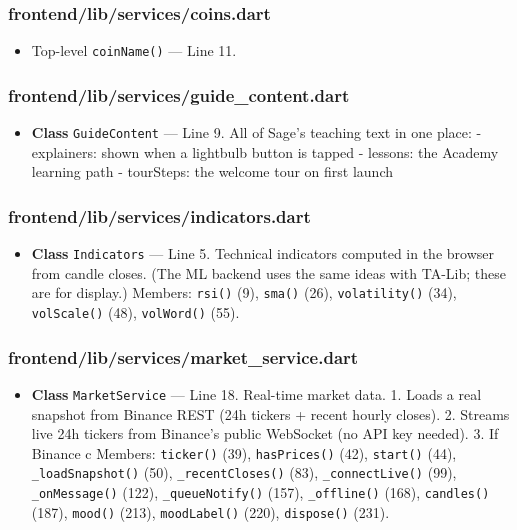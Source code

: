 \subsubsection*{frontend/lib/services/coins.dart}
\begin{itemize}[nosep,leftmargin=1.5em]
\item Top-level \texttt{coinName(\allowbreak{})} --- Line 11.
\end{itemize}
\subsubsection*{frontend/lib/services/guide\_content.dart}
\begin{itemize}[nosep,leftmargin=1.5em]
\item \textbf{Class} \texttt{GuideContent} --- Line 9. All of Sage's teaching text in one place: - explainers: shown when a lightbulb button is tapped - lessons: the Academy learning path - tourSteps: the welcome tour on first launch
\end{itemize}
\subsubsection*{frontend/lib/services/indicators.dart}
\begin{itemize}[nosep,leftmargin=1.5em]
\item \textbf{Class} \texttt{Indicators} --- Line 5. Technical indicators computed in the browser from candle closes. (The ML backend uses the same ideas with TA-Lib; these are for display.) Members: \texttt{rsi(\allowbreak{})} (9), \texttt{sma(\allowbreak{})} (26), \texttt{volatility(\allowbreak{})} (34), \texttt{volScale(\allowbreak{})} (48), \texttt{volWord(\allowbreak{})} (55).
\end{itemize}
\subsubsection*{frontend/lib/services/market\_service.dart}
\begin{itemize}[nosep,leftmargin=1.5em]
\item \textbf{Class} \texttt{MarketService} --- Line 18. Real-time market data. 1. Loads a real snapshot from Binance REST (24h tickers + recent hourly closes). 2. Streams live 24h tickers from Binance's public WebSocket (no API key needed). 3. If Binance c Members: \texttt{ticker(\allowbreak{})} (39), \texttt{hasPrices(\allowbreak{})} (42), \texttt{start(\allowbreak{})} (44), \texttt{\_\allowbreak{}loadSnapshot(\allowbreak{})} (50), \texttt{\_\allowbreak{}recentCloses(\allowbreak{})} (83), \texttt{\_\allowbreak{}connectLive(\allowbreak{})} (99), \texttt{\_\allowbreak{}onMessage(\allowbreak{})} (122), \texttt{\_\allowbreak{}queueNotify(\allowbreak{})} (157), \texttt{\_\allowbreak{}offline(\allowbreak{})} (168), \texttt{candles(\allowbreak{})} (187), \texttt{mood(\allowbreak{})} (213), \texttt{moodLabel(\allowbreak{})} (220), \texttt{dispose(\allowbreak{})} (231).
\end{itemize}
